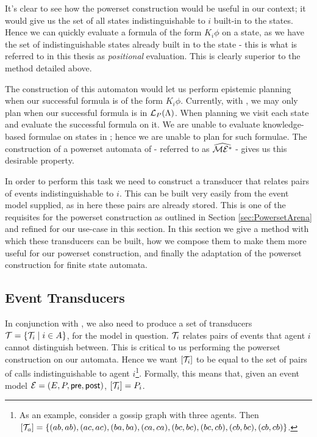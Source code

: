 \documentclass[10pt, a4paper]{report}
\begin{document}
It's clear to see how the powerset construction would be useful in our context;
it would give us the set of all states indistinguishable to $i$ built-in to the
states. Hence we can quickly evaluate a formula of the form $K_i \phi$ on a
state, as we have the set of indistinguishable states already built in to the
state - this is what is referred to in this thesis as \emph{positional}
evaluation. This is clearly superior to the method detailed above. 

The construction of this automaton would let us perform epistemic planning when
our successful formula is of the form $K_i \phi$. Currently, with \mestar, we
may only plan when our successful formula is in $\mathcal{L}_P(\Lambda)$. When
planning we visit each state and evaluate the successful formula on it. We are
unable to evaluate knowledge-based formulae on states in \mestar; hence we are
unable to plan for such formulae. The construction of a powerset automata of
\mestar - referred to as $\widehat{\mathcal{ME^\ast}}$ - gives us this desirable property.

In order to perform this task we need to construct a transducer that relates
pairs of events indistinguishable to $i$. This can be built very easily from the
event model supplied, as in here these pairs are already stored. This is one of
the requisites for the powerset construction as outlined in Section
\ref{sec:PowersetArena} and refined for our use-case in this section. In this
section we give a method with which these transducers can be built, how we
compose them to make them more useful for our powerset construction, and finally
the adaptation of the powerset construction for finite state automata.

\subsection{Event Transducers}

In conjunction with \mestar, we also need to produce a set of transducers
$\mathcal{T} = \{\mathcal{T}_i \mid i \in A\}$, for the model in question. $\mathcal{T}_i$
relates pairs of events that agent $i$ cannot distinguish between. This is
critical to us performing the powerset construction on our \mestar automata.
Hence we want $\left[ \mathcal{T}_i \right]$ to be equal to the set of pairs of calls
indistinguishable to agent $i$\footnote{As an example, consider a gossip graph
  with three agents. Then $\left[ \mathcal{T}_a \right] = \left\{ (ab, ab), (ac, ac),
    (ba, ba), (ca, ca), (bc, bc), (bc, cb), (cb, bc), (cb, cb) \right\} $.}.
Formally, this means that, given an event model $\mathcal{E} = (E, P, \textsf{pre}, \textsf{post})$,
$[\mathcal{T}_i] = P_i$. 
\end{document}
